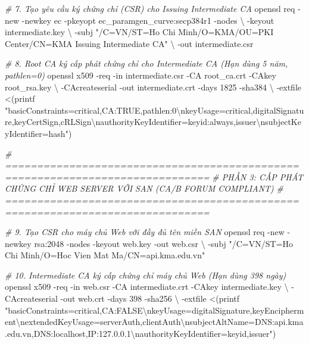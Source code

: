 \documentclass[
]{article}
\newenvironment{Shaded}{}{}
\newcommand{\AttributeTok}[1]{\textcolor[rgb]{0.49,0.56,0.16}{#1}}
\newcommand{\BuiltInTok}[1]{\textcolor[rgb]{0.00,0.50,0.00}{#1}}
\newcommand{\CommentTok}[1]{\textcolor[rgb]{0.38,0.63,0.69}{\textit{#1}}}
\newcommand{\DataTypeTok}[1]{\textcolor[rgb]{0.56,0.13,0.00}{#1}}
\newcommand{\ExtensionTok}[1]{#1}
\newcommand{\NormalTok}[1]{#1}
\newcommand{\OperatorTok}[1]{\textcolor[rgb]{0.40,0.40,0.40}{#1}}
\newcommand{\StringTok}[1]{\textcolor[rgb]{0.25,0.44,0.63}{#1}}
\begin{document}
\begin{Shaded}
\begin{Highlighting}[]
\CommentTok{\# 7. Tạo yêu cầu ký chứng chỉ (CSR) cho Issuing Intermediate CA}
\ExtensionTok{openssl}\NormalTok{ req }\AttributeTok{{-}new} \AttributeTok{{-}newkey}\NormalTok{ ec }\AttributeTok{{-}pkeyopt}\NormalTok{ ec\_paramgen\_curve:secp384r1 }\AttributeTok{{-}nodes} \DataTypeTok{\textbackslash{}}
  \AttributeTok{{-}keyout}\NormalTok{ intermediate.key }\DataTypeTok{\textbackslash{}}
  \AttributeTok{{-}subj} \StringTok{"/C=VN/ST=Ho Chi Minh/O=KMA/OU=PKI Center/CN=KMA Issuing Intermediate CA"} \DataTypeTok{\textbackslash{}}
  \AttributeTok{{-}out}\NormalTok{ intermediate.csr}

\CommentTok{\# 8. Root CA ký cấp phát chứng chỉ cho Intermediate CA (Hạn dùng 5 năm, pathlen=0)}
\ExtensionTok{openssl}\NormalTok{ x509 }\AttributeTok{{-}req} \AttributeTok{{-}in}\NormalTok{ intermediate.csr }\AttributeTok{{-}CA}\NormalTok{ root\_ca.crt }\AttributeTok{{-}CAkey}\NormalTok{ root\_rsa.key }\DataTypeTok{\textbackslash{}}
  \AttributeTok{{-}CAcreateserial} \AttributeTok{{-}out}\NormalTok{ intermediate.crt }\AttributeTok{{-}days}\NormalTok{ 1825 }\AttributeTok{{-}sha384} \DataTypeTok{\textbackslash{}}
  \AttributeTok{{-}extfile} \OperatorTok{\textless{}(}\BuiltInTok{printf} \StringTok{"basicConstraints=critical,CA:TRUE,pathlen:0\textbackslash{}nkeyUsage=critical,digitalSignature,keyCertSign,cRLSign\textbackslash{}nauthorityKeyIdentifier=keyid:always,issuer\textbackslash{}nsubjectKeyIdentifier=hash"}\OperatorTok{)}

\CommentTok{\# ==============================================================================}
\CommentTok{\# PHẦN 3: CẤP PHÁT CHỨNG CHỈ WEB SERVER VỚI SAN (CA/B FORUM COMPLIANT)}
\CommentTok{\# ==============================================================================}

\CommentTok{\# 9. Tạo CSR cho máy chủ Web với đầy đủ tên miền SAN}
\ExtensionTok{openssl}\NormalTok{ req }\AttributeTok{{-}new} \AttributeTok{{-}newkey}\NormalTok{ rsa:2048 }\AttributeTok{{-}nodes} \AttributeTok{{-}keyout}\NormalTok{ web.key }\AttributeTok{{-}out}\NormalTok{ web.csr }\DataTypeTok{\textbackslash{}}
  \AttributeTok{{-}subj} \StringTok{"/C=VN/ST=Ho Chi Minh/O=Hoc Vien Mat Ma/CN=api.kma.edu.vn"}

\CommentTok{\# 10. Intermediate CA ký cấp chứng chỉ máy chủ Web (Hạn dùng 398 ngày)}
\ExtensionTok{openssl}\NormalTok{ x509 }\AttributeTok{{-}req} \AttributeTok{{-}in}\NormalTok{ web.csr }\AttributeTok{{-}CA}\NormalTok{ intermediate.crt }\AttributeTok{{-}CAkey}\NormalTok{ intermediate.key }\DataTypeTok{\textbackslash{}}
  \AttributeTok{{-}CAcreateserial} \AttributeTok{{-}out}\NormalTok{ web.crt }\AttributeTok{{-}days}\NormalTok{ 398 }\AttributeTok{{-}sha256} \DataTypeTok{\textbackslash{}}
  \AttributeTok{{-}extfile} \OperatorTok{\textless{}(}\BuiltInTok{printf} \StringTok{"basicConstraints=critical,CA:FALSE\textbackslash{}nkeyUsage=digitalSignature,keyEncipherment\textbackslash{}nextendedKeyUsage=serverAuth,clientAuth\textbackslash{}nsubjectAltName=DNS:api.kma.edu.vn,DNS:localhost,IP:127.0.0.1\textbackslash{}nauthorityKeyIdentifier=keyid,issuer"}\OperatorTok{)}


\end{Highlighting}
\end{Shaded}
\end{document}
